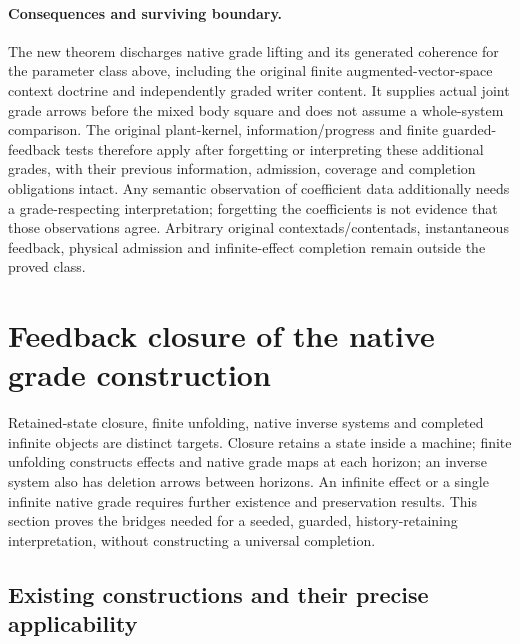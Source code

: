 \documentclass[11pt]{article}
\begin{document}
\paragraph{Consequences and surviving boundary.} The new theorem discharges native grade lifting and its generated coherence for the parameter class above, including the original finite augmented-vector-space context doctrine and independently graded writer content. It supplies actual joint grade arrows before the mixed body square and does not assume a whole-system comparison. The original plant-kernel, information/progress and finite guarded-feedback tests therefore apply after forgetting or interpreting these additional grades, with their previous information, admission, coverage and completion obligations intact. Any semantic observation of coefficient data additionally needs a grade-respecting interpretation; forgetting the coefficients is not evidence that those observations agree. Arbitrary original contextads/contentads, instantaneous feedback, physical admission and infinite-effect completion remain outside the proved class.


\section{Feedback closure of the native grade construction}\label{sec:graded-feedback}

Retained-state closure, finite unfolding, native inverse systems and completed infinite objects are distinct targets. Closure retains a state inside a machine; finite unfolding constructs effects and native grade maps at each horizon; an inverse system also has deletion arrows between horizons. An infinite effect or a single infinite native grade requires further existence and preservation results. This section proves the bridges needed for a seeded, guarded, history-retaining interpretation, without constructing a universal completion.

\subsection{Existing constructions and their precise applicability}
\end{document}
